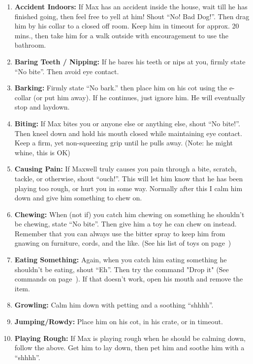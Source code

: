 \documentclass[pdftex,12pt]{article}
\begin{document}
\begin{enumerate}\label{itm:discipline}
    \item \textbf{Accident Indoors:} If Max has an accident inside the house, wait till he has finished going, then feel free to yell at him!
        Shout ``No!  Bad Dog!''.
        Then drag him by his collar to a closed off room.
        Keep him in timeout for approx. 20 mins., then take him for a walk outside with encouragement to use the bathroom.
    \item \textbf{Baring Teeth / Nipping:} If he bares his teeth or nips at you, firmly state ``No bite''.
        Then avoid eye contact.
    \item \textbf{Barking:} Firmly state ``No bark.'' then place him on his cot using the e-collar (or put him away).
        If he continues, just ignore him.
        He will eventually stop and laydown.
    \item \textbf{Biting:} If Max bites you or anyone else or anything else, shout ``No bite!''.
        Then kneel down and hold his mouth closed while maintaining eye contact.
        Keep a firm, yet non-squeezing grip until he pulls away.
        (Note: he might whine, this is OK)
    \item \textbf{Causing Pain:} If Maxwell truly causes you pain through a bite, scratch, tackle, or otherwise, shout ``ouch!''.
        This will let him know that he has been playing too rough, or hurt you in some way.
        Normally after this I calm him down and give him something to chew on.
    \item \textbf{Chewing:} When (not if) you catch him chewing on something he shouldn't be chewing, state ``No bite''.
        Then give him a toy he can chew on instead.
        Remember that you can always use the bitter spray to keep him from gnawing on furniture, cords, and the like.
        (See his list of toys on page~\pageref{itm:included_items})
    \item \textbf{Eating Something:} Again, when you catch him eating something he shouldn't be eating, shout ``Eh''.
        Then try the command "Drop it" (See commands on page~\pageref{tab:commands}).
        If that doesn't work, open his mouth and remove the item.
    \item \textbf{Growling:} Calm him down with petting and a soothing ``shhhh''.
    \item \textbf{Jumping/Rowdy:} Place him on his cot, in his crate, or in timeout.
    \item \textbf{Playing Rough:} If Max is playing rough when he should be calming down, follow the above.
        Get him to lay down, then pet him and soothe him with a ``shhhh''.
\end{enumerate}
\end{document}
